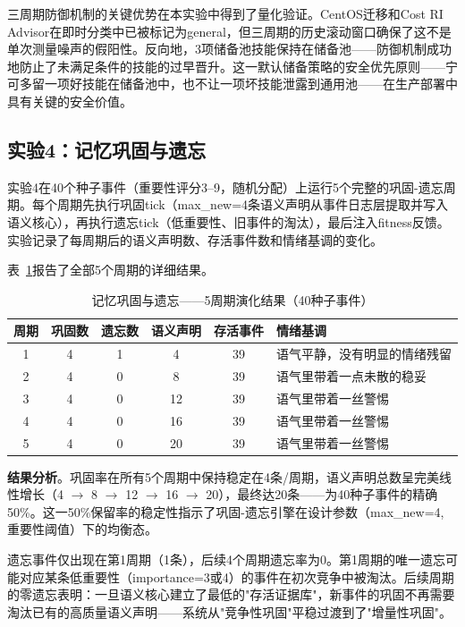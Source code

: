 \documentclass[12pt,a4paper]{ctexart}
\begin{document}
三周期防御机制的关键优势在本实验中得到了量化验证。CentOS迁移和Cost RI Advisor在即时分类中已被标记为general，但三周期的历史滚动窗口确保了这不是单次测量噪声的假阳性。反向地，3项储备池技能保持在储备池——防御机制成功地防止了未满足条件的技能的过早晋升。这一默认储备策略的安全优先原则——宁可多留一项好技能在储备池中，也不让一项坏技能泄露到通用池——在生产部署中具有关键的安全价值。

\subsection{实验4：记忆巩固与遗忘}

实验4在40个种子事件（重要性评分3--9，随机分配）上运行5个完整的巩固-遗忘周期。每个周期先执行巩固tick（max\_new=4条语义声明从事件日志层提取并写入语义核心），再执行遗忘tick（低重要性、旧事件的淘汰），最后注入fitness反馈。实验记录了每周期后的语义声明数、存活事件数和情绪基调的变化。

表~\ref{tab:memory}报告了全部5个周期的详细结果。

\begin{table}[H]
\centering
\caption{记忆巩固与遗忘——5周期演化结果（40种子事件）}
\label{tab:memory}
\renewcommand{\arraystretch}{1.15}
\begin{tabular}{cccccl}
\toprule
周期 & 巩固数 & 遗忘数 & 语义声明 & 存活事件 & 情绪基调 \\
\midrule
1 & 4 & 1 & 4 & 39 & 语气平静，没有明显的情绪残留 \\
2 & 4 & 0 & 8 & 39 & 语气里带着一点未散的稳妥 \\
3 & 4 & 0 & 12 & 39 & 语气里带着一丝警惕 \\
4 & 4 & 0 & 16 & 39 & 语气里带着一丝警惕 \\
5 & 4 & 0 & 20 & 39 & 语气里带着一丝警惕 \\
\bottomrule
\end{tabular}
\end{table}

\textbf{结果分析}。巩固率在所有5个周期中保持稳定在4条/周期，语义声明总数呈完美线性增长（4 $\to$ 8 $\to$ 12 $\to$ 16 $\to$ 20），最终达20条——为40种子事件的精确50\%。这一50\%保留率的稳定性指示了巩固-遗忘引擎在设计参数（max\_new=4, 重要性阈值）下的均衡态。

遗忘事件仅出现在第1周期（1条），后续4个周期遗忘率为0。第1周期的唯一遗忘可能对应某条低重要性（importance=3或4）的事件在初次竞争中被淘汰。后续周期的零遗忘表明：一旦语义核心建立了最低的"存活证据库"，新事件的巩固不再需要淘汰已有的高质量语义声明——系统从"竞争性巩固"平稳过渡到了"增量性巩固"。
\end{document}
